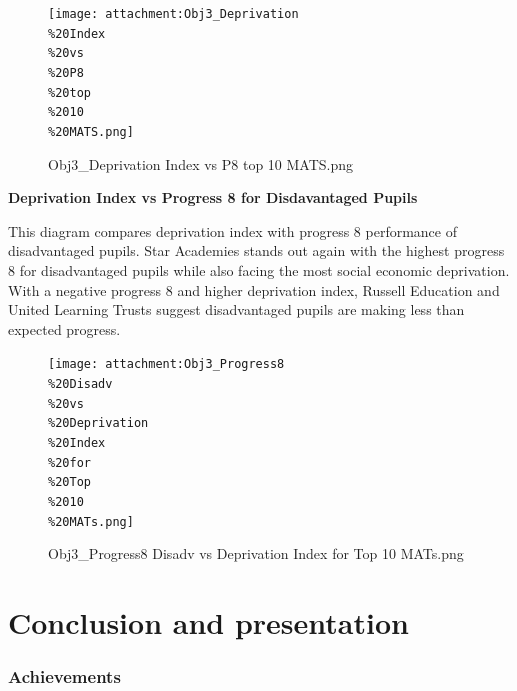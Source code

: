 \documentclass[
  letterpaper,
  DIV=11,
  numbers=noendperiod]{scrartcl}
\begin{document}
\begin{figure}[H]

{\centering \texttt{[image: attachment:Obj3\_Deprivation\\\%20Index\\\%20vs\\\%20P8\\\%20top\\\%2010\\\%20MATS.png]}

}

\caption{Obj3\_Deprivation Index vs P8 top 10 MATS.png}

\end{figure}%

\textbf{Deprivation Index vs Progress 8 for Disdavantaged Pupils}

This diagram compares deprivation index with progress 8 performance of
disadvantaged pupils. Star Academies stands out again with the highest
progress 8 for disadvantaged pupils while also facing the most social
economic deprivation. With a negative progress 8 and higher deprivation
index, Russell Education and United Learning Trusts suggest
disadvantaged pupils are making less than expected progress.

\begin{figure}[H]

{\centering \texttt{[image: attachment:Obj3\_Progress8\\\%20Disadv\\\%20vs\\\%20Deprivation\\\%20Index\\\%20for\\\%20Top\\\%2010\\\%20MATs.png]}

}

\caption{Obj3\_Progress8 Disadv vs Deprivation Index for Top 10
MATs.png}

\end{figure}%

\section{Conclusion and presentation}\label{conclusion-and-presentation}

\subsubsection{Achievements}\label{achievements}
\end{document}

